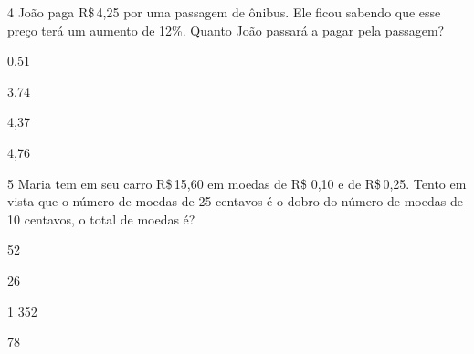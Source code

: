 \num{4} João paga R\$\,4,25 por uma passagem de ônibus. Ele ficou sabendo que
esse preço terá um aumento de 12\%. Quanto João passará a pagar pela
passagem?

\begin{multicols}{2}
\begin{escolha}
\item 0,51
\item 3,74
\item 4,37
\item 4,76
\end{escolha}
\end{multicols}











\pagebreak

\num{5} Maria tem em seu carro R\$\,15,60 em moedas de R\$ 0,10 e de R\$\,0,25.
Tento em vista que o número de moedas de 25 centavos é o dobro do número
de moedas de 10 centavos, o total de moedas é?

\begin{escolha}
\item 52
\item 26
\item 1 352
\item 78
\end{escolha}



